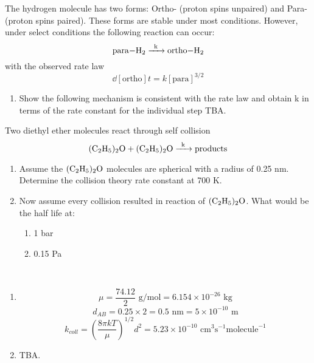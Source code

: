 \item The hydrogen molecule has two forms: Ortho- (proton spins unpaired) and Para- (proton spins
paired). These forms are stable under most conditions. However, under select conditions the
following reaction can occur:
\begin{equation*}
    \ce{para-H_2 ->[k] ortho-H_2}
\end{equation*}
with the observed rate law
\begin{equation*}
    \dd{[\text{ortho}]}{t}=k[\text{para}]^{3/2}
\end{equation*}
\begin{enumerate}
    \item Show the following mechanism is consistent with the rate law and obtain k in terms of the rate
          constant for the individual step
          TBA.
\end{enumerate}

\item Two diethyl ether molecules react through self collision
\begin{equation*}
    \ce{(C_2H_5)_2O +(C_2H_5)_2O ->[k] products}
\end{equation*}
\begin{enumerate}
    \item Assume the $\ce{(C_2H_5)_2O}$ molecules are spherical with a radius of 0.25 nm. Determine the collision
          theory rate constant at 700 K.
    \item Now assume every collision resulted in reaction of $\ce{(C_2H_5)_2O}$. What would be the half life at:
          \begin{enumerate}
              \item 1 bar
              \item 0.15 Pa
          \end{enumerate}
\end{enumerate}

\begin{solution}\
    \begin{enumerate}
        \item \begin{equation*}
                  \mu=\frac{74.12}{2}\text{ g/mol}=6.154\times10^{-26}\text{ kg}
              \end{equation*}
              \begin{equation*}
                  d_{AB}=0.25\times2=0.5\text{ nm}=5\times10^{-10}\text{ m}
              \end{equation*}
              \begin{equation*}
                  k_{coll}=\left(\frac{8\pi kT}{\mu}\right)^{1/2}d^2=5.23\times10^{-10}\text{ cm}^3\text{s}^{-1}
                  \text{molecule}^{-1}
              \end{equation*}
        \item TBA.
    \end{enumerate}
\end{solution}

